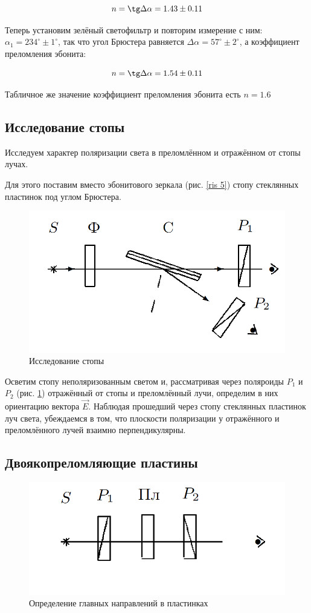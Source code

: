\documentclass[a4paper,12pt]{article}
\begin{document}
\[n = \tg \Delta \alpha = 1.43 \pm 0.11\]

Теперь установим зелёный светофильтр и повторим измерение с ним: $\alpha_1 = 234^\circ \pm 1^\circ$, так что угол Брюстера равняется $\Delta \alpha = 57^\circ \pm 2^\circ$, а коэффициент преломления эбонита:

\[n = \tg \Delta \alpha = 1.54 \pm 0.11\]

Табличное же значение коэффициент преломления эбонита есть $n=1.6$

\subsection*{Исследование стопы}

Исследуем характер поляризации света в преломлённом и отражённом от стопы лучах. 

Для этого поставим вместо эбонитового зеркала (рис. \ref{ris 5}) стопу стеклянных пластинок под углом Брюстера.

\begin{figure}[h] 
	\centering
	\includegraphics[width=0.3\linewidth]{6}
	\caption{Исследование стопы}
	\label{ris 6}
\end{figure}

Осветим стопу неполяризованным светом и, рассматривая через поляроиды $P_1$ и $P_2$ (рис. \ref{ris 6}) отражённый от стопы и преломлённый лучи, определим в них ориентацию вектора $ \vec{E} $. Наблюдая прошедший через стопу стеклянных пластинок луч света, убеждаемся в том, что плоскости поляризации у отражённого и преломлённого лучей взаимно перпендикулярны.

\subsection*{Двоякопреломляющие пластины}

\begin{figure}[h] 
	\centering
	\includegraphics[width=0.3\linewidth]{7}
	\caption{Определение главных направлений в пластинках}
	\label{ris 7}
\end{figure}
\end{document}
